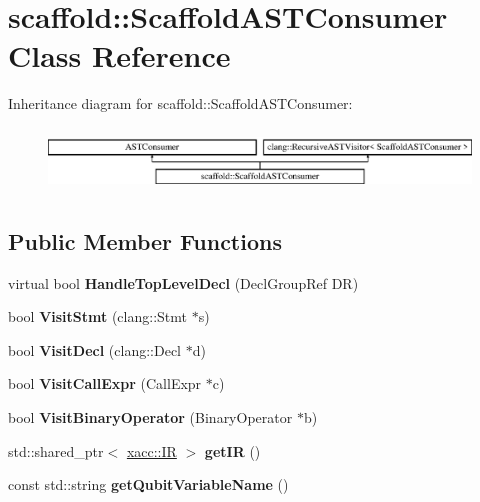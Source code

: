 \hypertarget{a00064}{}\section{scaffold\+:\+:Scaffold\+A\+S\+T\+Consumer Class Reference}
\label{a00064}
Inheritance diagram for scaffold\+:\+:Scaffold\+A\+S\+T\+Consumer\+:\begin{figure}[H]
\begin{center}
\leavevmode
\includegraphics[height=1.717791cm]{a00064}
\end{center}
\end{figure}
\subsection*{Public Member Functions}
\begin{DoxyCompactItemize}
\item 
virtual bool {\bfseries Handle\+Top\+Level\+Decl} (Decl\+Group\+Ref DR)\hypertarget{a00064_a14020b09423a4efb0f992ace1d482a57}{}\label{a00064_a14020b09423a4efb0f992ace1d482a57}

\item 
bool {\bfseries Visit\+Stmt} (clang\+::\+Stmt $\ast$s)\hypertarget{a00064_a3269dcedd2f3175837a94acbf74901d1}{}\label{a00064_a3269dcedd2f3175837a94acbf74901d1}

\item 
bool {\bfseries Visit\+Decl} (clang\+::\+Decl $\ast$d)\hypertarget{a00064_aa1c7cd8940ee725b88cc84256d19f555}{}\label{a00064_aa1c7cd8940ee725b88cc84256d19f555}

\item 
bool {\bfseries Visit\+Call\+Expr} (Call\+Expr $\ast$c)\hypertarget{a00064_a91844fe528e854e205429f3b5d2b0e47}{}\label{a00064_a91844fe528e854e205429f3b5d2b0e47}

\item 
bool {\bfseries Visit\+Binary\+Operator} (Binary\+Operator $\ast$b)\hypertarget{a00064_a598a634d96ffb4217bb0938720e669d2}{}\label{a00064_a598a634d96ffb4217bb0938720e669d2}

\item 
std\+::shared\+\_\+ptr$<$ \hyperlink{a00041}{xacc\+::\+IR} $>$ {\bfseries get\+IR} ()\hypertarget{a00064_a92d059cda85ffeafc8a35ed50a8d5f17}{}\label{a00064_a92d059cda85ffeafc8a35ed50a8d5f17}

\item 
const std\+::string {\bfseries get\+Qubit\+Variable\+Name} ()\hypertarget{a00064_ab1d779aee8690e77e7c9a89f93c41a1f}{}\label{a00064_ab1d779aee8690e77e7c9a89f93c41a1f}

\end{DoxyCompactItemize}
